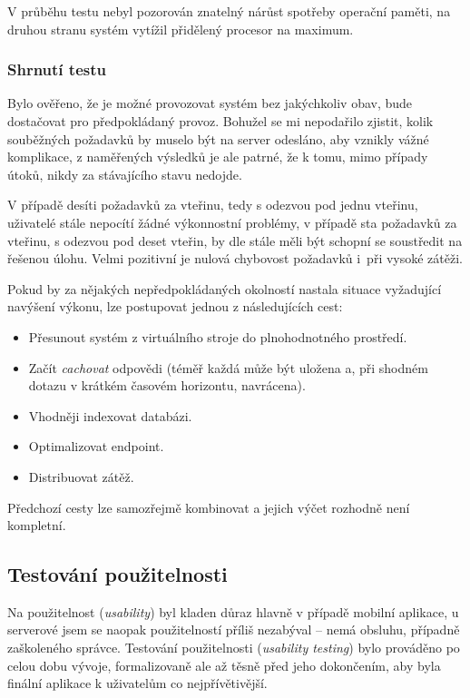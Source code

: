 V průběhu testu nebyl pozorován znatelný nárůst spotřeby operační paměti, na druhou stranu systém vytížil přidělený procesor na maximum.

\subsubsection{Shrnutí testu}
Bylo ověřeno, že je možné provozovat systém bez jakýchkoliv obav, bude dostačovat pro předpokládaný provoz. Bohužel se mi nepodařilo zjistit, kolik souběžných požadavků by muselo být na server odesláno, aby vznikly vážné komplikace, z naměřených výsledků je ale patrné, že k tomu, mimo případy útoků, nikdy za stávajícího stavu nedojde.

V případě desíti požadavků za vteřinu, tedy s odezvou pod jednu vteřinu, uživatelé stále nepocítí žádné výkonnostní problémy, v případě sta požadavků za vteřinu, s odezvou pod deset vteřin, by dle \cite{PagesizeUseit} stále měli být schopní se soustředit na řešenou úlohu. Velmi pozitivní je nulová chybovost požadavků i~při vysoké zátěži.

Pokud by za nějakých nepředpokládaných okolností nastala situace vyžadující navýšení výkonu, lze postupovat jednou z následujících cest:
\begin{itemize}
 \item Přesunout systém z virtuálního stroje do plnohodnotného prostředí.
 \item Začít \textit{cachovat} odpovědi (téměř každá může být uložena a, při shodném dotazu v krátkém časovém horizontu, navrácena).
 \item Vhodněji indexovat databázi.
 \item Optimalizovat  endpoint.
 \item Distribuovat zátěž.
\end{itemize}
Předchozí cesty lze samozřejmě kombinovat a jejich výčet rozhodně není kompletní.


\subsection{Testování použitelnosti}
Na použitelnost (\textit{usability}) byl kladen důraz hlavně v případě mobilní aplikace, u serverové jsem se naopak použitelností příliš nezabýval -- nemá obsluhu, případně zaškoleného správce. Testování použitelnosti (\textit{usability testing}) bylo prováděno po celou dobu vývoje, formalizovaně ale až těsně před jeho dokončením, aby byla finální aplikace k uživatelům co nejpřívětivější.

